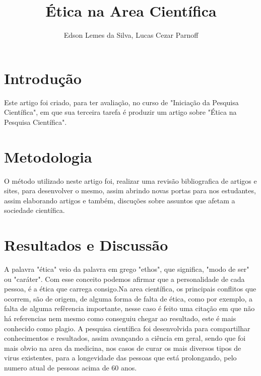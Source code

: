 \documentclass[12pt]{article}
\title{Ética na Area Cientí­fica}
\author{Edson Lemes da Silva, Lucas Cezar Parnoff}
\begin{document}
 

\maketitle

\begin{abstract}
  
\end{abstract}
     
\begin{resumo} 
  
\end{resumo}


\section{Introdução}\label{sec:introducao}
Este artigo foi criado, para ter avaliação,
no curso de "Iniciação da Pesquisa Científica",
em que sua terceira tarefa é produzir um artigo
sobre "Ética na Pesquisa Científica".
\section{Metodologia} \label{sec:desenvolv}
O método utilizado neste artigo foi, realizar uma 
revisão bibliografica de artigos e sites, 
para desenvolver o mesmo, assim abrindo novas portas
para nos estudantes, assim elaborando artigos e
também, discuções sobre assuntos que afetam a 
sociedade científica.  
\section{Resultados e Discussão}\label{sec:resuldisc}
A palavra "ética" veio da palavra em grego "ethos", que
significa, "modo de ser" ou "caráter"\cite{signi:etmo}.
Com esse conceito podemos afirmar que a personalidade de
cada pessoa, é a ética que carrega consigo.Na area
científica, os principais conflitos que ocorrem, são
de origem, de alguma forma de falta de ética, como por 
exemplo, a falta de alguma refêrencia importante, nesse 
caso é feito uma citação em que não há referencias nem 
mesmo como conseguiu chegar ao resultado, este é mais 
conhecido como plagio.
A pesquisa científica foi desenvolvida para compartilhar 
conhecimentos e resultados, assim avançando a ciência em
geral, sendo que foi mais obvio na area da medicina,
nos casos de curar os mais diversos tipos de virus 
existentes, para a longevidade das pessoas que está
prolongando, pelo numero atual de pessoas acima de 60 anos\cite{censo:10}.


 



\end{document}
